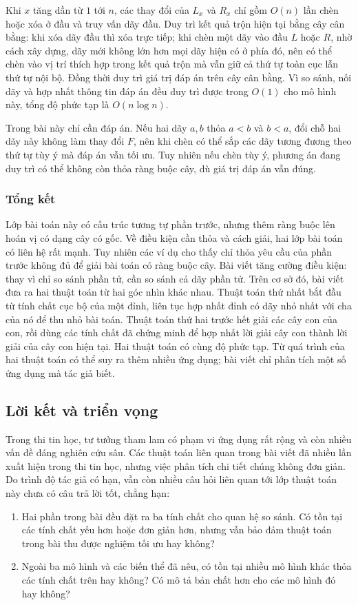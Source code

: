 \documentclass[11pt]{article}
\begin{document}
Khi $x$ tăng dần từ $1$ tới $n$, các thay đổi của $L_x$ và $R_x$ chỉ gồm
$O(n)$ lần chèn hoặc xóa ở đầu và truy vấn dãy đầu. Duy trì kết quả trộn hiện
tại bằng cây cân bằng: khi xóa dãy đầu thì xóa trực tiếp; khi chèn một dãy vào
đầu $L$ hoặc $R$, nhờ cách xây dựng, dãy mới không lớn hơn mọi dãy hiện có ở
phía đó, nên có thể chèn vào vị trí thích hợp trong kết quả trộn mà vẫn giữ cả
thứ tự toàn cục lẫn thứ tự nội bộ. Đồng thời duy trì giá trị đáp án trên cây
cân bằng. Vì so sánh, nối dãy và hợp nhất thông tin đáp án đều duy trì được
trong $O(1)$ cho mô hình này, tổng độ phức tạp là $O(n\log n)$.

Trong bài này chỉ cần đáp án. Nếu hai dãy $a,b$ thỏa $a<b$ và $b<a$, đổi chỗ
hai dãy này không làm thay đổi $F$, nên khi chèn có thể sắp các dãy tương đương
theo thứ tự tùy ý mà đáp án vẫn tối ưu. Tuy nhiên nếu chèn tùy ý, phương án đang
duy trì có thể không còn thỏa ràng buộc cây, dù giá trị đáp án vẫn đúng.

\subsubsection{Tổng kết}

Lớp bài toán này có cấu trúc tương tự phần trước, nhưng thêm ràng buộc lên hoán
vị có dạng cây có gốc. Về điều kiện cần thỏa và cách giải, hai lớp bài toán có
liên hệ rất mạnh. Tuy nhiên các ví dụ cho thấy chỉ thỏa yêu cầu của phần trước
không đủ để giải bài toán có ràng buộc cây. Bài viết tăng cường điều kiện: thay
vì chỉ so sánh phần tử, cần so sánh cả dãy phần tử. Trên cơ sở đó, bài viết đưa
ra hai thuật toán từ hai góc nhìn khác nhau. Thuật toán thứ nhất bắt đầu từ
tính chất cục bộ của một đỉnh, liên tục hợp nhất đỉnh có dãy nhỏ nhất với cha
của nó để thu nhỏ bài toán. Thuật toán thứ hai trước hết giải các cây con của
con, rồi dùng các tính chất đã chứng minh để hợp nhất lời giải cây con thành
lời giải của cây con hiện tại. Hai thuật toán có cùng độ phức tạp. Từ quá trình
của hai thuật toán có thể suy ra thêm nhiều ứng dụng; bài viết chỉ phân tích
một số ứng dụng mà tác giả biết.

\subsection{Lời kết và triển vọng}

Trong thi tin học, tư tưởng tham lam có phạm vi ứng dụng rất rộng và còn nhiều
vấn đề đáng nghiên cứu sâu. Các thuật toán liên quan trong bài viết đã nhiều
lần xuất hiện trong thi tin học, nhưng việc phân tích chi tiết chúng không đơn
giản. Do trình độ tác giả có hạn, vẫn còn nhiều câu hỏi liên quan tới lớp thuật
toán này chưa có câu trả lời tốt, chẳng hạn:
\begin{enumerate}
  \item Hai phần trong bài đều đặt ra ba tính chất cho quan hệ so sánh. Có tồn
  tại các tính chất yếu hơn hoặc đơn giản hơn, nhưng vẫn bảo đảm thuật toán
  trong bài thu được nghiệm tối ưu hay không?
  \item Ngoài ba mô hình và các biến thể đã nêu, có tồn tại nhiều mô hình khác
  thỏa các tính chất trên hay không? Có mô tả bản chất hơn cho các mô hình đó
  hay không?
\end{enumerate}
\end{document}
